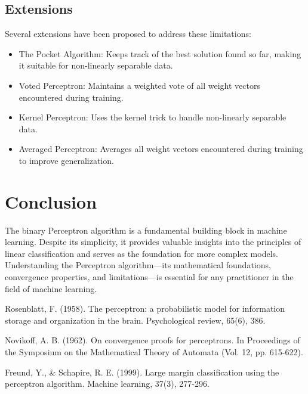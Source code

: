 \documentclass{article}
\begin{document}
\subsection{Extensions}

Several extensions have been proposed to address these limitations:
\begin{itemize}
    \item The Pocket Algorithm: Keeps track of the best solution found so far, making it suitable for non-linearly separable data.
    \item Voted Perceptron: Maintains a weighted vote of all weight vectors encountered during training.
    \item Kernel Perceptron: Uses the kernel trick to handle non-linearly separable data.
    \item Averaged Perceptron: Averages all weight vectors encountered during training to improve generalization.
\end{itemize}

\section{Conclusion}

The binary Perceptron algorithm is a fundamental building block in machine learning. Despite its simplicity, it provides valuable insights into the principles of linear classification and serves as the foundation for more complex models. Understanding the Perceptron algorithm—its mathematical foundations, convergence properties, and limitations—is essential for any practitioner in the field of machine learning.

\begin{thebibliography}{9}
Rosenblatt, F. (1958). The perceptron: a probabilistic model for information storage and organization in the brain. Psychological review, 65(6), 386.

Novikoff, A. B. (1962). On convergence proofs for perceptrons. In Proceedings of the Symposium on the Mathematical Theory of Automata (Vol. 12, pp. 615-622).

Freund, Y., \& Schapire, R. E. (1999). Large margin classification using the perceptron algorithm. Machine learning, 37(3), 277-296.
\end{thebibliography}
\end{document}
